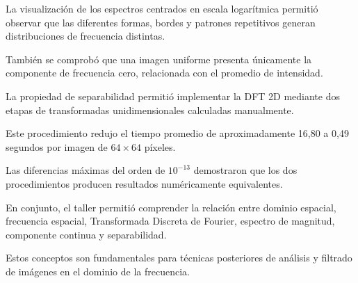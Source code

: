 \documentclass[11pt,letterpaper]{article}
\begin{document}
La visualización de los espectros centrados
en escala logarítmica permitió observar
que las diferentes formas, bordes
y patrones repetitivos generan
distribuciones de frecuencia distintas.

También se comprobó que una imagen uniforme
presenta únicamente la componente
de frecuencia cero, relacionada con
el promedio de intensidad.

La propiedad de separabilidad permitió
implementar la DFT 2D mediante dos etapas
de transformadas unidimensionales calculadas
manualmente.

Este procedimiento redujo el tiempo promedio
de aproximadamente 16,80 a 0,49 segundos
por imagen de $64\times64$ píxeles.

Las diferencias máximas del orden de
$10^{-13}$ demostraron que los dos
procedimientos producen resultados
numéricamente equivalentes.

En conjunto, el taller permitió comprender
la relación entre
dominio espacial, frecuencia espacial,
Transformada Discreta de Fourier,
espectro de magnitud, componente continua
y separabilidad.

Estos conceptos son fundamentales
para técnicas posteriores de análisis
y filtrado de imágenes en el dominio
de la frecuencia.
\end{document}
